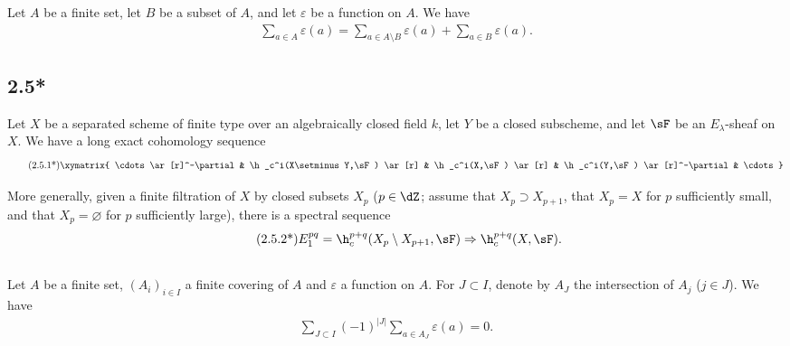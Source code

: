 \documentclass[oneside]{book}
\begin{document}
Let $A$ be a finite set, let $B$ be a subset of $A$, and let $\varepsilon$ be a 
function on $A$. We have 
\begin{align*}\tag{2.5.1}\label{VI:2-5-1}
  \sum_{a\in A} \varepsilon(a) = \sum_{a\in A\setminus B}\varepsilon(a) + \sum_{a\in B} \varepsilon(a) \text{.}
\end{align*}





\subsection*{2.5*}\label{VI:2-5*}

Let $X$ be a separated scheme of finite type over an algebraically closed field $k$, 
let $Y$ be a closed subscheme, and let $\sF$ be an $E_\lambda$-sheaf on $X$. We have 
a long exact cohomology sequence 
\begin{align*}\tag{2.5.1*}\label{VI:eq:2-5-1*}
\xymatrix{
  \cdots \ar[r]^-\partial 
    & \h_c^i(X\setminus Y,\sF) \ar[r] 
    & \h_c^i(X,\sF) \ar[r] 
    & \h_c^i(Y,\sF) \ar[r]^-\partial 
    & \cdots 
}
\end{align*}

More generally, given a finite filtration of $X$ by closed subsets 
$X_p$ ($p\in \dZ$; assume that $X_p\supset X_{p+1}$, that $X_p=X$ 
for $p$ sufficiently small, and that $X_p=\varnothing$ for $p$ sufficiently large), there is a 
spectral sequence 
\begin{align*}\tag{2.5.2*}\label{VI:eq:2-5-2*}
  E_1^{p q} = \h_c^{p+q}(X_p\setminus X_{p+1},\sF) \Rightarrow \h_c^{p+q}(X,\sF) \text{.}
\end{align*}





\subsection{}\label{VI:2-6}

Let $A$ be a finite set, $(A_i)_{i\in I}$ a finite covering of $A$ and 
$\varepsilon$ a function on $A$. For $J\subset I$, denote by $A_J$ 
the intersection of $A_j$ ($j\in J$). We have 
\begin{align*}\tag{2.6.1}\label{VI:eq:2-6-1}
  \sum_{J\subset I} (-1)^{|J|} \sum_{a\in A_J} \varepsilon(a) = 0 \text{.}
\end{align*}
\end{document}
